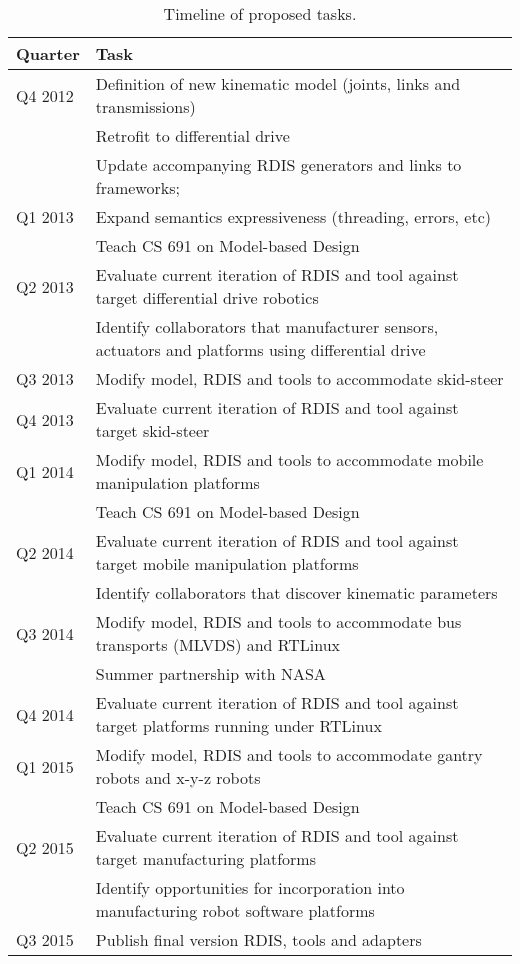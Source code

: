 \begin{table}[htbp]
   \centering
   \begin{tabular}{|l|l|} 
   \hline
      {\bf Quarter}    & {\bf Task} \\
      \hline
      Q4 2012       &  Definition of new kinematic model (joints, links and transmissions)\\
      			&Retrofit to differential drive \\
      			&Update accompanying RDIS generators and links to frameworks;  \\
      Q1 2013       &Expand semantics expressiveness (threading, errors, etc)\\
						&Teach CS 691 on Model-based Design\\
      Q2 2013       & Evaluate current iteration of RDIS and tool against target differential drive robotics\\
     			&Identify collaborators that manufacturer sensors, actuators and platforms using differential drive\\
       Q3 2013	&Modify model, RDIS and tools to accommodate skid-steer\\
      Q4 2013       &Evaluate current iteration of RDIS and tool against target skid-steer \\
      Q1 2014       &Modify model, RDIS and tools to accommodate mobile manipulation platforms \\
						&Teach CS 691 on Model-based Design\\
      Q2 2014       &Evaluate current iteration of RDIS and tool against target mobile manipulation platforms \\
      			&Identify collaborators that discover kinematic parameters\\
      Q3 2014       & Modify model, RDIS and tools to accommodate bus transports (MLVDS) and RTLinux\\
      			&Summer partnership with NASA\\
      Q4 2014       &Evaluate current iteration of RDIS and tool against target platforms running under RTLinux\\
      Q1 2015       & Modify model, RDIS and tools to accommodate gantry robots and x-y-z robots\\
						&Teach CS 691 on Model-based Design\\
      Q2 2015       & Evaluate current iteration of RDIS and tool against target manufacturing platforms\\
      			& Identify opportunities for incorporation into manufacturing robot software platforms\\
      Q3 2015       & Publish final version RDIS, tools and adapters\\
      \hline
   \end{tabular}
   \caption{Timeline of proposed tasks.}
   \label{tab:tasks}
\end{table}
